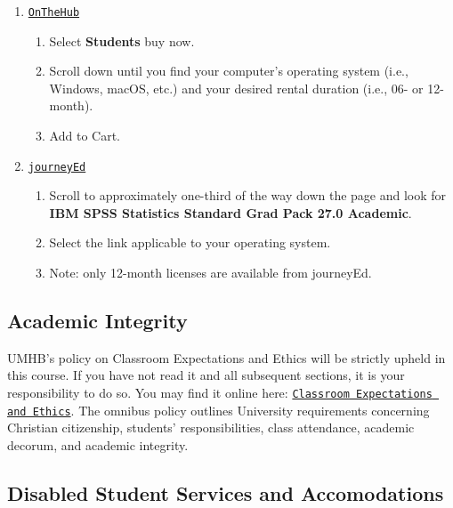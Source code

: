 \documentclass[
]{article}
\providecommand{\tightlist}{%
  \setlength{\itemsep}{0pt}\setlength{\parskip}{0pt}}
\begin{document}
\begin{enumerate}
\def\labelenumi{\arabic{enumi}.}
\tightlist
\item
  \texttt{\href{https://onthehub.com/spss/}{OnTheHub}}

  \begin{enumerate}
  \def\labelenumii{\arabic{enumii}.}
  \tightlist
  \item
    Select \textbf{Students} buy now.
  \item
    Scroll down until you find your computer's operating system (i.e.,
    Windows, macOS, etc.) and your desired rental duration (i.e., 06- or
    12-month).
  \item
    Add to Cart.
  \end{enumerate}
\item
  \texttt{\href{https://www.journeyed.com/products/IBM+SPSS/IBM+SPSS+Statistics}{journeyEd}}

  \begin{enumerate}
  \def\labelenumii{\arabic{enumii}.}
  \tightlist
  \item
    Scroll to approximately one-third of the way down the page and look
    for \textbf{IBM SPSS Statistics Standard Grad Pack 27.0 Academic}.
  \item
    Select the link applicable to your operating system.
  \item
    Note: only 12-month licenses are available from journeyEd.
  \end{enumerate}
\end{enumerate}

\subsection{Academic Integrity}

UMHB's policy on Classroom Expectations and Ethics will be strictly
upheld in this course. If you have not read it and all subsequent
sections, it is your responsibility to do so. You may find it online
here:
\href{http://catalog.umhb.edu/2019-2020/Graduate-Catalog/Classroom-Expectations-and-Ethics}{\texttt{Classroom Expectations and Ethics}}.
The omnibus policy outlines University requirements concerning Christian
citizenship, students' responsibilities, class attendance, academic
decorum, and academic integrity.

\subsection{Disabled Student Services and Accomodations}
\end{document}
